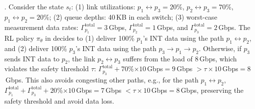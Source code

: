
. Consider the state $s_t$: (1) link utilizations: $p_1\leftrightarrow p_3=20$\%, $p_2\leftrightarrow p_3=70$\%, $p_1\leftrightarrow p_2=20$\%; (2) queue depths: 40\,KB in each switch; (3) worst-case measurement data rates: $\Gamma_{p_1}^{\text{total}}=3$\,Gbps, $\Gamma_{p_2}^{\text{total}}=1$\,Gbps, and $\Gamma_{p_3}^{\text{total}}=2$\,Gbps. The RL policy $\pi_{\theta}$ in \sysname decides to (1) deliver 100\% $p_1$'s INT data using the path $p_1\leftrightarrow p_2$, and (2) deliver 100\% $p_3$'s INT data using the path $p_3\rightarrow p_1\rightarrow p_2$. Otherwise, if $p_3$ sends INT data to $p_2$, the link $p_2\leftrightarrow p_3$ suffers from the load of 8\,Gbps, which violates the safety threshold $\tau$: $\Gamma_{p_3}^{\text{total}}+70$\%$\times 10$\,Gbps$=9$\,Gbps $> \tau\times 10$\,Gbps$=8$\,Gbps. This also avoids congesting other paths, e.g., for the path $p_1 \leftrightarrow p_2$, $\Gamma_{p_1}^{\text{total}}+\Gamma_{p_3}^{\text{total}}+20$\%$\times 10$\,Gbps$=7$\,Gbps $< \tau\times 10$\,Gbps$=8$\,Gbps, preserving the safety threshold and avoid data loss. 












